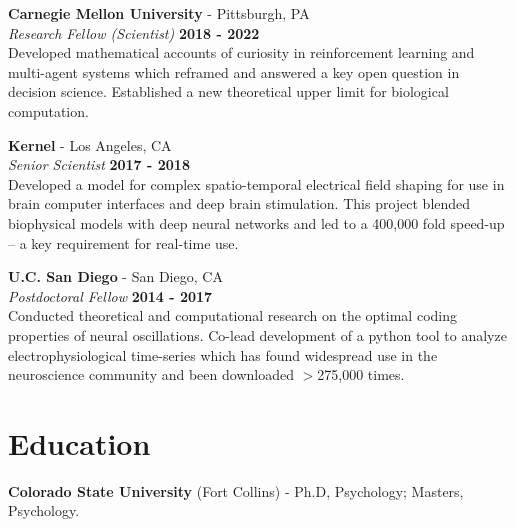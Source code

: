 \documentclass[margin,line]{res}
\begin{document}
\begin{resume}
\vspace{-.1cm}
{\bf Carnegie Mellon University} - Pittsburgh, PA \\
{\em Research Fellow (Scientist)} \hfill {\bf 2018 - 2022}\\
Developed mathematical accounts of curiosity in reinforcement learning and multi-agent systems which reframed and answered a key open question in decision science. Established a new theoretical upper limit for biological computation. 

\vspace{-.1cm}
{\bf Kernel} - Los Angeles, CA\\
{\em Senior Scientist} \hfill {\bf 2017 - 2018}\\
Developed a model for complex spatio-temporal electrical field shaping for use in brain computer interfaces and deep brain stimulation. This project blended biophysical models with deep neural networks and led to a 400,000 fold speed-up -- a key requirement for real-time use.

\vspace{-.1cm}
{\bf U.C. San Diego} - San Diego, CA\\
{\em Postdoctoral Fellow} \hfill {\bf 2014 - 2017}\\
Conducted theoretical and computational research on the optimal coding properties of neural oscillations. Co-lead development of a python tool to analyze electrophysiological time-series which has found widespread use in the neuroscience community and been downloaded $>$275,000 times.



\vspace{-.2cm}
\section{\sc Education}
{\bf Colorado State University} (Fort Collins) - Ph.D, Psychology; Masters, Psychology.\\
\vspace*{-.15in}


\end{resume}
\end{document}
